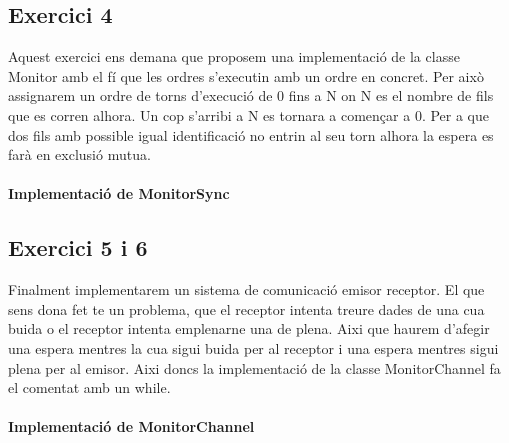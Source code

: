 \documentclass[12pt, a4papre]{article}
\begin{document}
	\subsection{Exercici 4} 
	
	Aquest exercici ens demana que proposem una implementació de la classe Monitor amb el fí que les ordres s'executin amb un ordre en concret. Per això assignarem un ordre de torns d'execució de 0 fins a N on N es el nombre de fils que es corren alhora. Un cop s'arribi a N es tornara a començar a 0. Per a que dos fils amb possible igual identificació no entrin al seu torn alhora la espera es farà en exclusió mutua.
	\\\\
	\textbf{Implementació de MonitorSync}
	
	
	\subsection{Exercici 5 i 6} 
	
	Finalment implementarem un sistema de comunicació emisor receptor. El que sens dona fet te un problema, que el receptor intenta treure dades de una cua buida o el receptor intenta emplenarne una de plena. Aixi que haurem d'afegir una espera mentres la cua sigui buida per al receptor i una espera mentres sigui plena per al emisor. Aixi doncs la implementació de la classe MonitorChannel fa el comentat amb un while.
	\\\\
	\textbf{Implementació de MonitorChannel}
	
	
\end{document}
